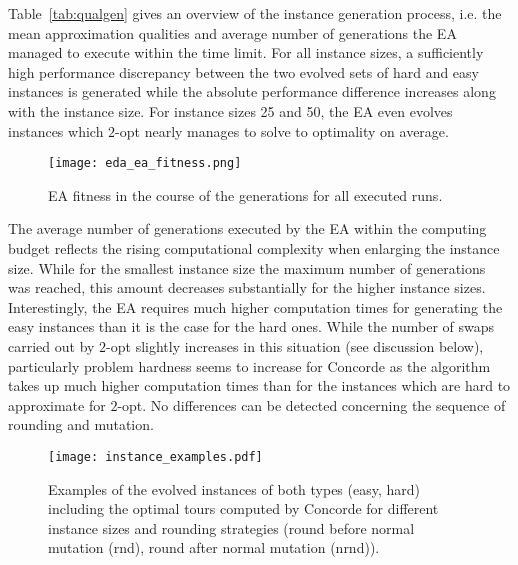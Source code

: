 \documentclass{article}
\begin{document}
Table~\ref{tab:qualgen} gives an overview of the instance generation
process, i.e. the mean approximation qualities and average number of
generations the EA managed to execute within the time limit. For all
instance sizes, a sufficiently high performance discrepancy between
the two evolved sets of hard and easy instances is generated while the
absolute performance difference increases along with the instance
size. For instance sizes 25 and 50, the EA even evolves instances
which $2$-opt nearly manages to solve to optimality on average.

\begin{figure}
  \centering
  \texttt{[image: eda\_ea\_fitness.png]}
  \caption{EA fitness in the course of the generations for all
    executed runs.}
  \label{fig:eafitness}
\end{figure}

The average number of generations executed by the EA within the
computing budget reflects the rising computational complexity when
enlarging the instance size. While for the smallest instance size the
maximum number of generations was reached, this amount decreases
substantially for the higher instance sizes. Interestingly, the EA
requires much higher computation times for generating the easy
instances than it is the case for the hard ones. While the number of
swaps carried out by $2$-opt slightly increases in this situation (see
discussion below), particularly problem hardness seems to increase for
Concorde as the algorithm takes up much higher computation times than
for the instances which are hard to approximate for $2$-opt. No
differences can be detected concerning the sequence of rounding and
mutation.

\begin{figure}
  \centering
  \texttt{[image: instance\_examples.pdf]}
  \caption{Examples of the evolved instances of both types (easy,
    hard) including the optimal tours computed by Concorde for
    different instance sizes and rounding strategies (round before
    normal mutation (rnd), round after normal mutation (nrnd)).}
  \label{fig:extour}
\end{figure}
\end{document}
